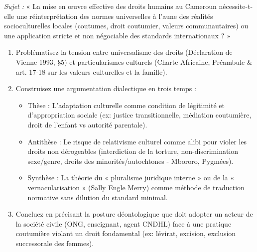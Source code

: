 \documentclass[11pt]{article}
\begin{document}
\begin{exercice}
    \textit{Sujet :} « La mise en œuvre effective des droits humains au Cameroun nécessite-t-elle une réinterprétation des normes universelles à l'aune des réalités socioculturelles locales (coutumes, droit coutumier, valeurs communautaires) ou une application stricte et non négociable des standards internationaux ? »
\begin{enumerate}
        \item Problématisez la tension entre universalisme des droits (Déclaration de Vienne 1993, §5) et particularismes culturels (Charte Africaine, Préambule \& art. 17-18 sur les valeurs culturelles et la famille).
        \item Construisez une argumentation dialectique en trois temps :
              \begin{itemize}
                  \item Thèse : L'adaptation culturelle comme condition de légitimité et d'appropriation sociale (ex: justice transitionnelle, médiation coutumière, droit de l'enfant vs autorité parentale).
                  \item Antithèse : Le risque de relativisme culturel comme alibi pour violer les droits non dérogeables (interdiction de la torture, non-discrimination sexe/genre, droits des minorités/autochtones - Mbororo, Pygmées).
                  \item Synthèse : La théorie du « pluralisme juridique interne » ou de la « vernacularisation » (Sally Engle Merry) comme méthode de traduction normative sans dilution du standard minimal.
              \end{itemize}
        \item Concluez en précisant la posture déontologique que doit adopter un acteur de la société civile (ONG, enseignant, agent CNDHL) face à une pratique coutumière violant un droit fondamental (ex: lévirat, excision, exclusion successorale des femmes).
    \end{enumerate}
\end{exercice}
\end{document}
